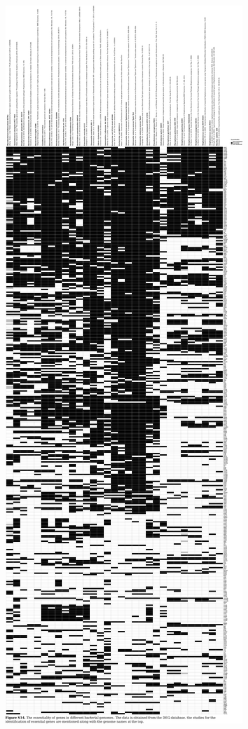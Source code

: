 \documentclass{article}
\begin{document}
\begin{preview}
\includegraphics{suppl14.pdf}
\end{preview}
\end{document}

